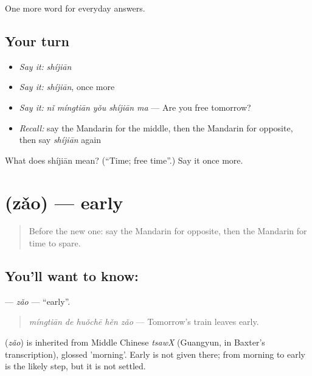 \begin{grammarlens}[title={What you've built}]
One more word for everyday answers.
\end{grammarlens}

\subsection*{Your turn}
\begin{itemize}
\raggedright
  \item \emph{Say it:} \emph{shíjiān}
  \item \emph{Say it:} \emph{shíjiān}, once more
  \item \emph{Say it:} \emph{nǐ míngtiān yǒu shíjiān ma} — Are you free tomorrow?
  \item \emph{Recall:} say the Mandarin for the middle, then the Mandarin for opposite, then say \emph{shíjiān} again
\end{itemize}

\begin{tcolorbox}[breakable,colback=teal!4,colframe=teal!35!black,title={Before you move on}]
What does shíjiān mean? (\textquotedblleft{}Time; free time\textquotedblright{}.) Say it once more.
\end{tcolorbox}
\section[\texorpdfstring{\zh{早} (zǎo)}{早 (zǎo)}]{ (zǎo) — early}

\label{lesson:ZH-C83-zao}



\begin{quote}
Before the new one: say the Mandarin for opposite, then the Mandarin for time to spare.
\end{quote}

\subsection*{You'll want to know: }
\textbf{} — \emph{zǎo} — \textquotedblleft{}early\textquotedblright{}.

\begin{quote}
\textbf{} \emph{míngtiān de huǒchē hěn zǎo} — Tomorrow's train leaves early.
\end{quote}

\begin{cousinweb}
\textbf{} (\emph{zǎo}) is inherited from Middle Chinese \emph{tsawX} (Guangyun, in Baxter's transcription), glossed 'morning'. Early is not given there; from morning to early is the likely step, but it is not settled.
\end{cousinweb}

